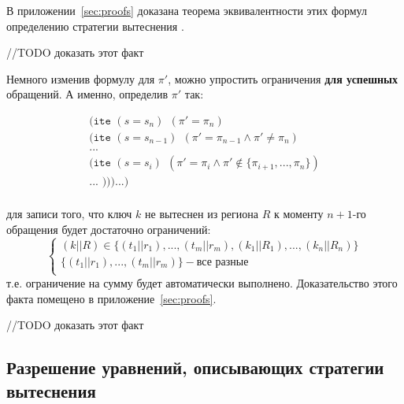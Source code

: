 В приложении~\ref{sec:proofs} доказана теорема эквивалентности этих формул определению стратегии вытеснения \PseudoLRU.

//TODO доказать этот факт

Немного изменив формулу для $\pi'$, можно упростить ограничения \textbf{для успешных} обращений. А именно, определив $\pi'$ так:

$$
\begin{array}{l}
\texttt{(ite~} (s = s_n) ~~ (\pi' = \pi_n)\\
\texttt{(ite~} (s = s_{n-1}) ~~ (\pi' = \pi_{n-1} \wedge \pi' \neq \pi_n)\\
...\\
\texttt{(ite~} (s = s_i) ~~ (\pi' = \pi_i \wedge \pi' \notin \{\pi_{i+1}, ..., \pi_n\})\\
... \texttt{~)))...)}\\
\end{array}
$$

для записи того, что ключ $k$ не вытеснен из региона $R$ к моменту $n+1$-го обращения будет достаточно ограничений:
$$
\left\{\begin{array}{l}
(k||R) \in \{(t_1||r_1), ..., (t_m||r_m), (k_1||R_1), ..., (k_n||R_n)\}\\
\{(t_1||r_1), ..., (t_m||r_m)\} - \mbox{все разные}\\
\end{array} \right.
$$
т.е. ограничение на сумму будет автоматически выполнено. Доказательство этого факта помещено в приложение~\ref{sec:proofs}.

//TODO доказать этот факт

\subsection{Разрешение уравнений, описывающих стратегии вытеснения}

